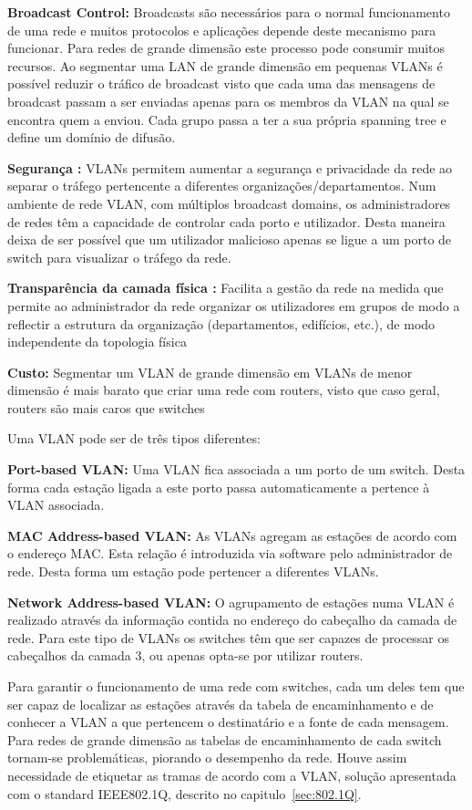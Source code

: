 \documentclass[a4paper]{IEEEtran}
\begin{document}
\textbf{Broadcast Control:} Broadcasts são necessários para o normal funcionamento de uma rede e muitos protocolos e aplicações depende deste mecanismo para funcionar. Para redes de grande dimensão este processo pode consumir muitos recursos. Ao segmentar uma LAN de grande dimensão em pequenas VLANs é possível reduzir o tráfico de broadcast visto que cada uma das mensagens de broadcast passam a ser enviadas apenas para os membros da VLAN na qual se encontra quem a enviou. Cada grupo passa a ter a sua própria spanning tree e define um domínio de difusão.

\textbf{Segurança :} VLANs permitem aumentar a segurança e privacidade da rede ao separar o tráfego pertencente a diferentes organizações/departamentos. Num ambiente de rede VLAN, com múltiplos broadcast domains, os administradores de redes têm a capacidade de controlar cada porto e utilizador. Desta maneira deixa de ser possível que um utilizador malicioso apenas se ligue a um porto de switch para visualizar o tráfego da rede. 

\textbf{Transparência da camada física :} Facilita a gestão da rede na medida que permite ao administrador da rede organizar os utilizadores em grupos de modo a reflectir a estrutura da organização (departamentos, edifícios, etc.), de modo independente da topologia física

\textbf{Custo: }Segmentar um VLAN de grande dimensão em VLANs de menor dimensão é mais barato que criar uma rede com routers, visto que caso geral, routers são mais caros que switches 


Uma VLAN pode ser de três tipos diferentes: 

\textbf{Port-based VLAN:} Uma VLAN fica associada a um porto de um switch. Desta forma cada estação ligada a este porto passa automaticamente a pertence à VLAN associada.

\textbf{MAC Address-based VLAN:} As VLANs agregam as estações de acordo com o endereço MAC. Esta relação é introduzida via software pelo administrador de rede. Desta forma um estação pode pertencer a diferentes VLANs.

\textbf{Network Address-based VLAN:} O agrupamento de estações numa VLAN é realizado através da informação contida no endereço do cabeçalho da camada de rede. Para este tipo de VLANs os switches têm que ser capazes de processar os cabeçalhos da camada 3, ou apenas opta-se por utilizar routers.

Para garantir o funcionamento de uma rede com switches, cada um deles tem que ser capaz de localizar as estações através da tabela de encaminhamento e de conhecer a VLAN a que pertencem o destinatário e a fonte de cada mensagem. Para redes de grande dimensão as tabelas de encaminhamento de cada switch tornam-se problemáticas, piorando o desempenho da rede. 
Houve assim necessidade de etiquetar as tramas de acordo com a VLAN, solução apresentada com o standard IEEE802.1Q, descrito no capitulo~\ref{sec:802.1Q}. 
\end{document}
